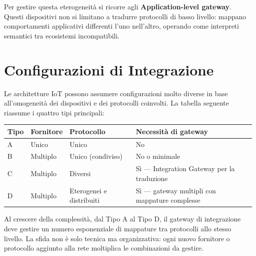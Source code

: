\documentclass[
  italian,
  openany]{book}
\newcounter{none} %
\begin{document}
Per gestire questa eterogeneità si ricorre agli
\textbf{Application-level gateway}. Questi dispositivi non si limitano a
tradurre protocolli di basso livello: mappano comportamenti applicativi
differenti l'uno nell'altro, operando come interpreti semantici tra
ecosistemi incompatibili.

\section{Configurazioni di
Integrazione}\label{configurazioni-di-integrazione}

Le architetture IoT possono assumere configurazioni molto diverse in
base all'omogeneità dei dispositivi e dei protocolli coinvolti. La
tabella seguente riassume i quattro tipi principali:

{\def\LTcaptype{none} %
\begin{longtable}[]{@{}
  >{\raggedright\arraybackslash}p{}
  >{\raggedright\arraybackslash}p{}
  >{\raggedright\arraybackslash}p{}
  >{\raggedright\arraybackslash}p{}@{}}
\toprule\noalign{}
\begin{minipage}[b]{\linewidth}\raggedright
Tipo
\end{minipage} & \begin{minipage}[b]{\linewidth}\raggedright
Fornitore
\end{minipage} & \begin{minipage}[b]{\linewidth}\raggedright
Protocollo
\end{minipage} & \begin{minipage}[b]{\linewidth}\raggedright
Necessità di gateway
\end{minipage} \\
\midrule\noalign{}
\endhead
\bottomrule\noalign{}
\endlastfoot
A & Unico & Unico & No \\
B & Multiplo & Unico (condiviso) & No o minimale \\
C & Multiplo & Diversi & Sì --- Integration Gateway per la traduzione \\
D & Multiplo & Eterogenei e distribuiti & Sì --- gateway multipli con
mappature complesse \\
\end{longtable}
}

Al crescere della complessità, dal Tipo A al Tipo D, il gateway di
integrazione deve gestire un numero esponenziale di mappature tra
protocolli allo stesso livello. La sfida non è solo tecnica ma
organizzativa: ogni nuovo fornitore o protocollo aggiunto alla rete
moltiplica le combinazioni da gestire.
\end{document}
